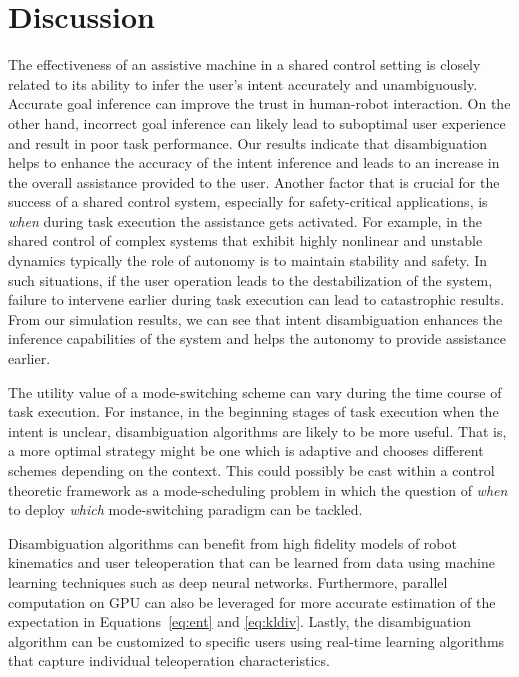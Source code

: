 \documentclass[letterpaper, 10 pt, conference]{ieeeconf}  %
\begin{document}
\section{Discussion}\label{sec:discussions}

The effectiveness of an assistive machine in a shared control setting is closely related to its ability to infer the user's intent accurately and unambiguously. Accurate goal inference can improve the trust in human-robot interaction. On the other hand, incorrect goal inference can likely lead to suboptimal user experience and result in poor task performance. Our results indicate that disambiguation helps to enhance the accuracy of the intent inference and leads to an increase in the overall assistance provided to the user. Another factor that is crucial for the success of a shared control system, especially for safety-critical applications, is \textit{when} during task execution the assistance gets activated. For example, in the shared control of complex systems that exhibit highly nonlinear and unstable dynamics typically the role of autonomy is to maintain stability and safety. In such situations, if the user operation leads to the destabilization of the system, failure to intervene earlier during task execution can lead to catastrophic results. From our simulation results, we can see that intent disambiguation enhances the inference capabilities of the system and helps the autonomy to provide assistance earlier.

The utility value of a mode-switching scheme can vary during the time course of task execution. For instance, in the beginning stages of task execution when the intent is unclear, disambiguation algorithms are likely to be more useful. That is, a more optimal strategy might be one which is adaptive and chooses different schemes depending on the context. This could possibly be cast within a control theoretic framework as a mode-scheduling problem in which the question of \textit{when} to deploy \textit{which} mode-switching paradigm can be tackled.

Disambiguation algorithms can benefit from high fidelity models of robot kinematics and user teleoperation that can be learned from data using machine learning techniques such as deep neural networks. Furthermore, parallel computation on GPU can also be leveraged for more accurate estimation of the expectation in Equations~\ref{eq:ent} and \ref{eq:kldiv}. Lastly, the disambiguation algorithm can be customized to specific users using real-time learning algorithms that capture individual teleoperation characteristics.
\end{document}

